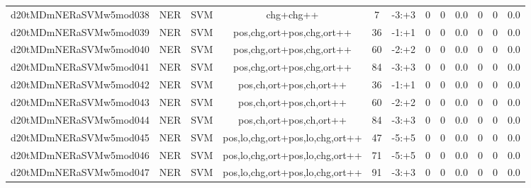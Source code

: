 \documentclass[a4paper]{article}
\begin{document}
\begin{landscape}
\begin{center}
\begin{tabular}{ |c|c|c|c|c|c|c|c|c|c|c|c|}
 
 	
 	\small{ d20tMDmNERaSVMw5mod038 } & \small{ NER} & \small{  SVM }  & chg+chg++  &  7 &  \small{  -3:+3 }  &  0 & 0 & 0.0  &  0 & 0 & 0.0 \\
 	

 
 	
 	\small{ d20tMDmNERaSVMw5mod039 } & \small{ NER} & \small{  SVM }  & pos,chg,ort+pos,chg,ort++  &  36 &  \small{  -1:+1 }  &  0 & 0 & 0.0  &  0 & 0 & 0.0 \\
 	

 
 	
 	\small{ d20tMDmNERaSVMw5mod040 } & \small{ NER} & \small{  SVM }  & pos,chg,ort+pos,chg,ort++  &  60 &  \small{  -2:+2 }  &  0 & 0 & 0.0  &  0 & 0 & 0.0 \\
 	

 
 	
 	\small{ d20tMDmNERaSVMw5mod041 } & \small{ NER} & \small{  SVM }  & pos,chg,ort+pos,chg,ort++  &  84 &  \small{  -3:+3 }  &  0 & 0 & 0.0  &  0 & 0 & 0.0 \\
 	

 
 	
 	\small{ d20tMDmNERaSVMw5mod042 } & \small{ NER} & \small{  SVM }  & pos,ch,ort+pos,ch,ort++  &  36 &  \small{  -1:+1 }  &  0 & 0 & 0.0  &  0 & 0 & 0.0 \\
 	

 
 	
 	\small{ d20tMDmNERaSVMw5mod043 } & \small{ NER} & \small{  SVM }  & pos,ch,ort+pos,ch,ort++  &  60 &  \small{  -2:+2 }  &  0 & 0 & 0.0  &  0 & 0 & 0.0 \\
 	

 
 	
 	\small{ d20tMDmNERaSVMw5mod044 } & \small{ NER} & \small{  SVM }  & pos,ch,ort+pos,ch,ort++  &  84 &  \small{  -3:+3 }  &  0 & 0 & 0.0  &  0 & 0 & 0.0 \\
 	

 
 	
 	\small{ d20tMDmNERaSVMw5mod045 } & \small{ NER} & \small{  SVM }  & pos,lo,chg,ort+pos,lo,chg,ort++  &  47 &  \small{  -5:+5 }  &  0 & 0 & 0.0  &  0 & 0 & 0.0 \\
 	

 
 	
 	\small{ d20tMDmNERaSVMw5mod046 } & \small{ NER} & \small{  SVM }  & pos,lo,chg,ort+pos,lo,chg,ort++  &  71 &  \small{  -5:+5 }  &  0 & 0 & 0.0  &  0 & 0 & 0.0 \\
 	

 
 	
 	\small{ d20tMDmNERaSVMw5mod047 } & \small{ NER} & \small{  SVM }  & pos,lo,chg,ort+pos,lo,chg,ort++  &  91 &  \small{  -3:+3 }  &  0 & 0 & 0.0  &  0 & 0 & 0.0 \\
 	


\end{tabular}
\end{center}
\end{landscape}
\end{document}
